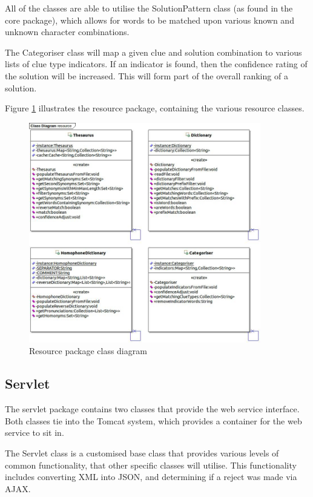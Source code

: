 All of the classes are able to utilise the SolutionPattern class (as found in 
the core package), which allows for words to be matched upon various known and 
unknown character combinations.

The Categoriser class will map a given clue and solution combination to various 
lists of clue type indicators. If an indicator is found, then the confidence 
rating of the solution will be increased. This will form part of the overall 
ranking of a solution.

Figure \ref{fig:resource_package} illustrates the resource package, containing 
the various resource classes.

\begin{figure}[H]
  \centering
  \includegraphics[width=0.9\textwidth]{class/resource.jpg}
  \caption{Resource package class diagram}
  \label{fig:resource_package}
\end{figure}


\subsection{Servlet}
\label{sub:servlet}

The servlet package contains two classes that provide the web service interface.
Both classes tie into the Tomcat system, which provides a container for the web
service to sit in. 

The Servlet class is a customised base class that provides various levels of 
common functionality, that other specific classes will utilise. This 
functionality includes converting XML into JSON, and determining if a reject was
made via AJAX.

